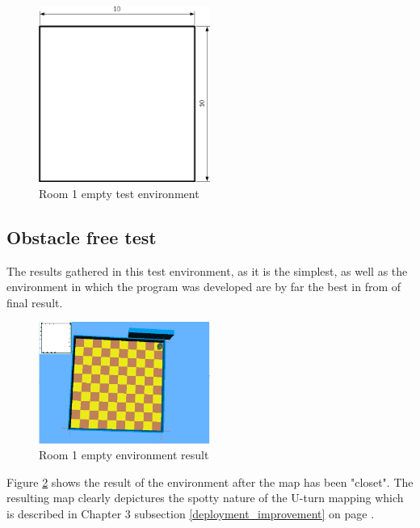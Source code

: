 \begin{figure}[h]
\centering
\includegraphics[width = 0.5\textwidth]{../../figures/room1_empty.png} 
\caption{Room 1 empty test environment}
\label{room1_empty}
\end{figure}

\subsection{Obstacle free test}

The results gathered in this test environment, as it is the simplest, as well as the environment in which the program was developed are by far the best in from of final result. \\

\begin{figure}[h]
\centering
\includegraphics[width = 0.5\textwidth]{../../figures/map_results/result_room1_empty.png} 
\caption{Room 1 empty environment result}
\label{room1_empty_result}
\end{figure}

Figure \ref{room1_empty_result} shows the result of the environment after the map has been "closet". The resulting map clearly depictures the spotty nature of the U-turn mapping which is described in Chapter 3 subsection \ref{deployment_improvement} on page \pageref{deployment_improvement} . \\[3ex]

